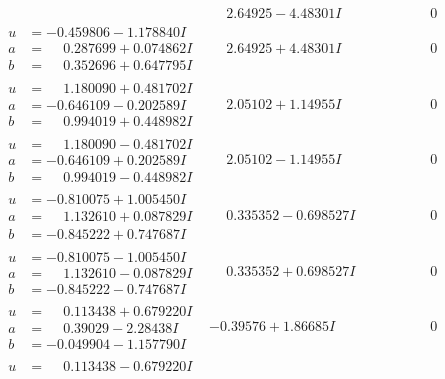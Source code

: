 \documentclass[1p]{elsarticle_modified}
\theoremstyle{definition}
\begin{document}
$$\begin{array}{c|c|c}
 & \phantom{-}2.64925 - 4.48301 I & \phantom{-0.000000 } 0 \\ \hline\begin{aligned}
u &= -0.459806 - 1.178840 I \\
a &= \phantom{-}0.287699 + 0.074862 I \\
b &= \phantom{-}0.352696 + 0.647795 I\end{aligned}
 & \phantom{-}2.64925 + 4.48301 I & \phantom{-0.000000 } 0 \\ \hline\begin{aligned}
u &= \phantom{-}1.180090 + 0.481702 I \\
a &= -0.646109 - 0.202589 I \\
b &= \phantom{-}0.994019 + 0.448982 I\end{aligned}
 & \phantom{-}2.05102 + 1.14955 I & \phantom{-0.000000 } 0 \\ \hline\begin{aligned}
u &= \phantom{-}1.180090 - 0.481702 I \\
a &= -0.646109 + 0.202589 I \\
b &= \phantom{-}0.994019 - 0.448982 I\end{aligned}
 & \phantom{-}2.05102 - 1.14955 I & \phantom{-0.000000 } 0 \\ \hline\begin{aligned}
u &= -0.810075 + 1.005450 I \\
a &= \phantom{-}1.132610 + 0.087829 I \\
b &= -0.845222 + 0.747687 I\end{aligned}
 & \phantom{-}0.335352 - 0.698527 I & \phantom{-0.000000 } 0 \\ \hline\begin{aligned}
u &= -0.810075 - 1.005450 I \\
a &= \phantom{-}1.132610 - 0.087829 I \\
b &= -0.845222 - 0.747687 I\end{aligned}
 & \phantom{-}0.335352 + 0.698527 I & \phantom{-0.000000 } 0 \\ \hline\begin{aligned}
u &= \phantom{-}0.113438 + 0.679220 I \\
a &= \phantom{-}0.39029 - 2.28438 I \\
b &= -0.049904 - 1.157790 I\end{aligned}
 & -0.39576 + 1.86685 I & \phantom{-0.000000 } 0 \\ \hline\begin{aligned}
u &= \phantom{-}0.113438 - 0.679220 I \\

\end{aligned}
\end{array}$$
\end{document}
